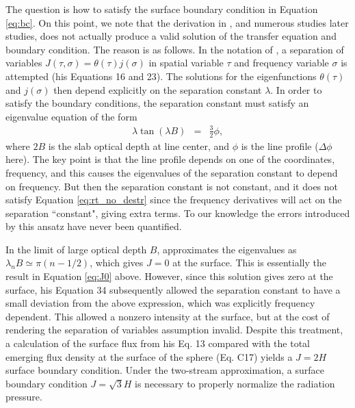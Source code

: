 \documentclass{aastex63}
\newcommand{\be}{\begin{eqnarray}}
\newcommand{\ee}{\end{eqnarray}}
\begin{document}
The question is how to satisfy the surface boundary condition in Equation \ref{eq:bc}. On this point, we note that the derivation in \citet{1973MNRAS.162...43H}, and numerous studies later studies, does not actually produce a valid solution of the transfer equation and boundary condition. The reason is as follows. In the notation of \citet{1973MNRAS.162...43H}, a separation of variables
$J(\tau,\sigma) = \theta(\tau) j(\sigma)$ in spatial variable $\tau$ and frequency variable $\sigma$ is attempted (his Equations 16 and 23). The solutions for the eigenfunctions $\theta(\tau)$ and $j(\sigma)$ then depend explicitly on the separation constant $\lambda$. In order to satisfy the boundary conditions, the separation constant must satisfy an eigenvalue equation of the form
\be
\lambda \tan(\lambda B) & = & \frac{3}{2} \phi,
\label{eq:evalue}
\ee
where $2B$ is the slab optical depth at line center, and $\phi$ is the line profile ($\Delta \phi$ here). The key point is that the line profile depends on one of the coordinates, frequency, and this causes the eigenvalues of the separation constant to depend on frequency. But then the separation constant is not constant, and it does not satisfy Equation \ref{eq:rt_no_destr} since the frequency derivatives will act on the separation ``constant", giving extra terms. To our knowledge the errors introduced by this ansatz have never been quantified. 

In the limit of large optical depth $B$, \citealt{1973MNRAS.162...43H} approximates the eigenvalues as $\lambda_n B \simeq \pi (n-1/2)$, which gives $J=0$ at the surface. This is essentially the result in Equation \ref{eq:J0} above. However, since this solution gives zero at the surface, his Equation 34 subsequently allowed the separation constant to have a small deviation from the above expression, which was explicitly frequency dependent. This allowed a nonzero intensity at the surface, but at the cost of rendering the separation of variables assumption invalid. Despite this treatment, a calculation of the surface flux from his Eq. 13 compared with the total emerging flux density at the surface of the sphere (Eq. C17) yields a $J=2H$ surface boundary condition. Under the two-stream approximation, a surface boundary condition $J=\sqrt{3}H$ is necessary to properly normalize the radiation pressure.
\end{document}
